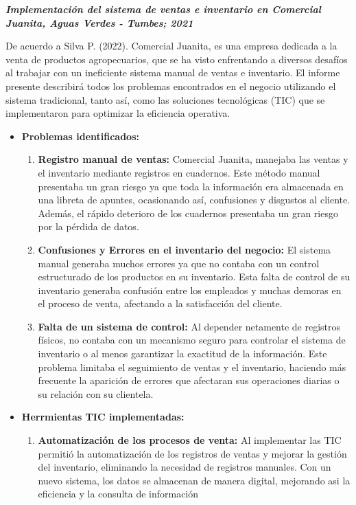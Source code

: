 \documentclass{article}
\begin{document}
\textbf{\textit{Implementación del sistema de ventas e inventario en Comercial Juanita, Aguas Verdes - Tumbes; 2021}}

De acuerdo a Silva P. (2022). Comercial Juanita, es una empresa dedicada a la venta de productos agropecuarios, que se ha visto enfrentando a diversos desafíos al trabajar con un ineficiente sistema manual de ventas e inventario. El informe presente describirá todos los problemas encontrados en el negocio utilizando el sistema tradicional, tanto así, como las soluciones tecnológicas (TIC) que se implementaron para optimizar la eficiencia operativa. 

\begin{itemize}
  \item \textbf{Problemas identificados:} 
  \begin{enumerate}
    \item \textbf{Registro manual de ventas:} Comercial Juanita, manejaba las ventas y el inventario mediante registros en cuadernos. Este método manual presentaba un gran riesgo ya que toda la información era almacenada en una libreta de apuntes, ocasionando así, confusiones y disgustos al cliente. Además, el rápido deterioro de los cuadernos presentaba un gran riesgo por la pérdida de datos. 
    \item \textbf{Confusiones y Errores en el inventario del negocio:} El sistema manual generaba muchos errores ya que no contaba con un control estructurado de los productos en su inventario. Esta falta de control de su inventario generaba confusión entre los empleados y muchas demoras en el proceso de venta, afectando a la satisfacción del cliente.   
    \item \textbf{Falta de un sistema de control:} Al depender netamente de registros físicos, no contaba con un mecanismo seguro para controlar el sistema de inventario o al menos garantizar la exactitud de la información. Este problema limitaba el seguimiento de ventas y el inventario, haciendo más frecuente la aparición de errores que afectaran sus operaciones diarias o su relación con su clientela. 
  \end{enumerate}
  \item \textbf{Herrmientas TIC implementadas:}
  \begin{enumerate}
    \item \textbf{Automatización de los procesos de venta:} Al implementar las TIC permitió la automatización de los registros de ventas y mejorar la gestión del inventario, eliminando la necesidad de registros manuales. Con un nuevo sistema, los datos se almacenan de manera digital, mejorando asi la eficiencia y la consulta de información 

\end{enumerate}
\end{itemize}
\end{document}
